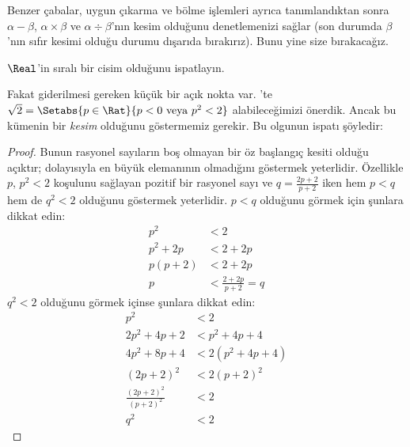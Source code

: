 \documentclass[../../../include/open-logic-section]{subfiles}
\begin{document}
Benzer çabalar, uygun çıkarma ve bölme işlemleri ayrıca tanımlandıktan sonra
$\alpha - \beta$, $\alpha \times \beta$ ve $\alpha \div \beta$'nın kesim
olduğunu denetlemenizi sağlar (son durumda $\beta$'nın sıfır kesimi olduğu
durumu dışarıda bırakırız). Bunu yine size bırakacağız.

\begin{prob}
$\Real$'in sıralı bir cisim olduğunu ispatlayın.
\end{prob}

Fakat giderilmesi gereken küçük bir açık nokta var. 'te
$\sqrt{2} = \Setabs{p \in \Rat}{p < 0 \text{ veya }p^2 < 2}$
alabileceğimizi önerdik. Ancak bu kümenin bir \emph{kesim} olduğunu
göstermemiz gerekir. Bu olgunun ispatı şöyledir:

\begin{proof}
Bunun rasyonel sayıların boş olmayan bir öz başlangıç kesiti olduğu açıktır;
dolayısıyla en büyük elemanının olmadığını göstermek yeterlidir. Özellikle
$p$, $p^2 < 2$ koşulunu sağlayan pozitif bir rasyonel sayı ve
$q = \frac{2p+2}{p+2}$ iken hem $p < q$ hem de $q^2 < 2$ olduğunu göstermek
yeterlidir. $p < q$ olduğunu görmek için şunlara dikkat edin:
\begin{align*}
	p^2 &< 2\\
	p^2 + 2p &< 2 + 2p\\
	p(p + 2) &< 2 + 2p\\
	p &< \tfrac{2+2p}{p+2} = q
\end{align*}
$q^2 < 2$ olduğunu görmek içinse şunlara dikkat edin:
\begin{align*}
	p^2 &< 2\\
	2p^2 + 4p + 2 &< p^2 + 4p+ 4\\
	4p^2 + 8p + 4 &< 2(p^2 + 4p + 4)\\
	(2p+2)^2 & <2(p+2)^2\\
	\tfrac{(2p+2)^2}{(p+2)^2} &< 2\\
	q^2 &< 2
\end{align*}
\end{proof}
\end{document}
